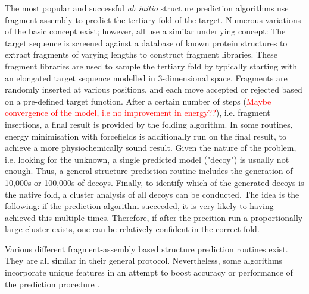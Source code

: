 The most popular and successful \textit{ab initio} structure prediction algorithms use fragment-assembly to predict the tertiary fold of the target. Numerous variations of the basic concept exist; however, all use a similar underlying concept: The target sequence is screened against a database of known protein structures to extract fragments of varying lengths to construct fragment libraries. These fragment libraries are used to sample the tertiary fold by typically starting with an elongated target sequence modelled in 3-dimensional space. Fragments are randomly inserted at various positions, and each move accepted or rejected based on a pre-defined target function. After a certain number of steps (\textcolor{red}{Maybe convergence of the model, i.e no improvement in energy??}), i.e. fragment insertions, a final result is provided by the folding algorithm. In some routines, energy minimisation with forcefields is additionally run on the final result, to achieve a more physiochemically sound result. Given the nature of the problem, i.e. looking for the unknown, a single predicted model ("decoy") is usually not enough. Thus, a general structure prediction routine includes the generation of 10,000s or 100,000s of decoys. Finally, to identify which of the generated decoys is the native fold, a cluster analysis of all decoys can be conducted. The idea is the following: if the prediction algorithm succeeded, it is very likely to having achieved this multiple times. Therefore, if after the precition run a proportionally large cluster exists, one can be relatively confident in the correct fold.

Various different fragment-assembly based structure prediction routines exist. They are all similar in their general protocol. Nevertheless, some algorithms incorporate unique features in an attempt to boost accuracy or performance of the prediction procedure \cite{Jones2001,Rohl2004,Ellis2010,Adhikari2018}.

